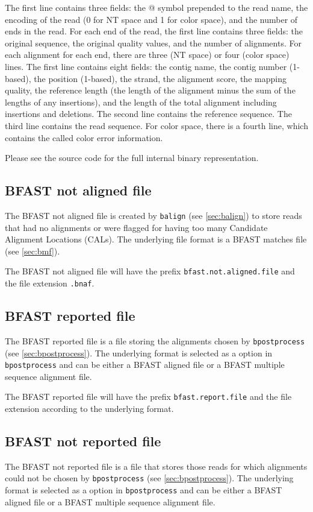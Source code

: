 \documentclass[a4paper,12pt]{book}
\newcommand{\TT}[1]{{\tt #1}} %
\newcommand{\BMF}{BFAST matches file} %
\newcommand{\BAF}{BFAST aligned file} %
\newcommand{\BNAF}{BFAST not aligned file} %
\newcommand{\BRF}{BFAST reported file} %
\newcommand{\BNRF}{BFAST not reported file} %
\newcommand{\BMAF}{BFAST multiple sequence alignment file} %
\begin{document}
The first line contains three fields: the @ symbol prepended to the read name, the encoding of the read (0 for NT space and 1 for color space), and the number of ends in the read.
For each end of the read, the first line contains three fields: the original sequence, the original quality values, and the number of alignments.
For each alignment for each end, there are three (NT space) or four (color space) lines.
The first line contains eight fields: the contig name, the contig number (1-based), the position (1-based), the strand, the alignment score, the mapping quality, the reference length (the length of the alignment minus the sum of the lengths of any insertions), and the length of the total alignment including insertions and deletions.
The second line contains the reference sequence.
The third line contains the read sequence.
For color space, there is a fourth line, which contains the called color error information.

Please see the source code for the full internal binary representation.

\subsection{\BNAF{}}
\label{sec:bnaf}
The \BNAF{} is created by \TT{balign} (see \autoref{sec:balign}) to store reads that had no alignments or were flagged for having too many Candidate Alignment Locations (CALs).
The underlying file format is a \BMF{} (see \autoref{sec:bmf}).

The \BNAF{} will have the prefix \TT{bfast.not.aligned.file} and the file extension \TT{.bnaf}.

\subsection{\BRF{}}
\label{sec:brf}
The \BRF{} is a file storing the alignments chosen by \TT{bpostprocess} (see \autoref{sec:bpostprocess}).
The underlying format is selected as a option in \TT{bpostprocess} and can be either a \BAF{} or a \BMAF{}.

The \BRF{} will have the prefix \TT{bfast.report.file} and the file extension according to the underlying format.

\subsection{\BNRF{}}
\label{sec:bnrf}
The \BNRF{} is a file that stores those reads for which alignments could not be chosen by \TT{bpostprocess} (see \autoref{sec:bpostprocess}).
The underlying format is selected as a option in \TT{bpostprocess} and can be either a \BAF{} or a \BMAF{}.
\end{document}
